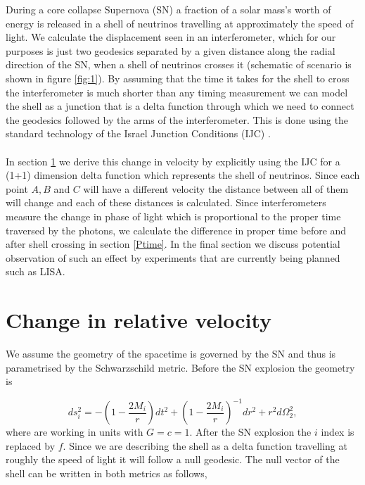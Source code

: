 \documentclass[aps,showpacs,twocolumn,floats,prd,superscriptaddress,nofootinbib]{revtex4-1}
\begin{document}
During a core collapse Supernova (SN) a fraction of a solar mass's worth of energy is released in a shell of neutrinos travelling at approximately the speed of light. We calculate the displacement seen in an interferometer, which for our purposes is just two geodesics separated by a given distance along the radial direction of the SN, when a shell of neutrinos crosses it (schematic of scenario is shown in figure \ref{fig:1}). By assuming that the time it takes for the shell to cross the interferometer is much shorter than any timing measurement we can model the shell as a junction that is a delta function through which we need to connect the geodesics followed by the arms of the interferometer. This is done using the standard technology of the Israel Junction Conditions (IJC) \cite{Isr66}. 
\\
\\
In section \ref{RelV} we derive this change in velocity by explicitly using the IJC for a (1+1) dimension delta function which represents the shell of neutrinos. Since each point $A,B$ and $C$ will have a different velocity the distance between all of them will change and each of these distances is calculated. Since interferometers measure the change in phase of light which is proportional to the proper time traversed by the photons, we calculate the difference in proper time before and after shell crossing in section \ref{Ptime}. In the final section we discuss potential observation of such an effect by experiments that are currently being planned such as LISA. 

\section{Change in relative velocity}
\label{RelV}

We assume the geometry of the spacetime is governed by the SN and thus is parametrised by the Schwarzschild metric. Before the SN explosion the geometry is

\begin{equation}
	ds^2_i = - \left( 1 - \frac{2M_i}{r} \right) dt^2 + \left( 1 - \frac{2M_i}{r} \right)^{-1} dr^2 + r^2 d \Omega_2^2,
\end{equation}
where are working in units with $G = c =1$. After the SN explosion the $i$ index is replaced by $f$. Since we are describing the shell as a delta function travelling at roughly the speed of light it will follow a null geodesic. The null vector of the shell can be written in both metrics as follows,
\end{document}

